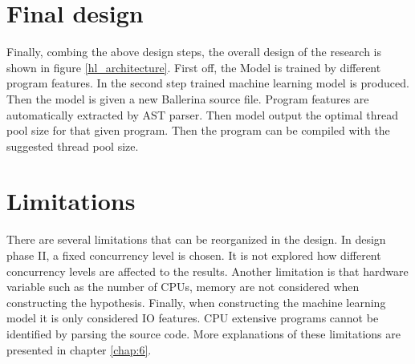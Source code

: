 \section{Final design}\label{sec:final_design}

Finally, combing the above design steps, the overall design of the research is shown in figure \ref{hl_architecture}. First off, the Model is trained by different program features. In the second step trained machine learning model is produced. Then the model is given a new Ballerina source file. Program features are automatically extracted by AST parser. Then model output the optimal thread pool size for that given program. Then the program can be compiled with the suggested thread pool size. 

\section{Limitations}

There are several limitations that can be reorganized in the design. In design phase II, a fixed concurrency level is chosen. It is not explored how different concurrency levels are affected to the results. Another limitation is that hardware variable such as the number of CPUs, memory are not considered when constructing the hypothesis. Finally, when constructing the machine learning model it is only considered IO features. CPU extensive programs cannot be identified by parsing the source code. More explanations of these limitations are presented in chapter \ref{chap:6}.

